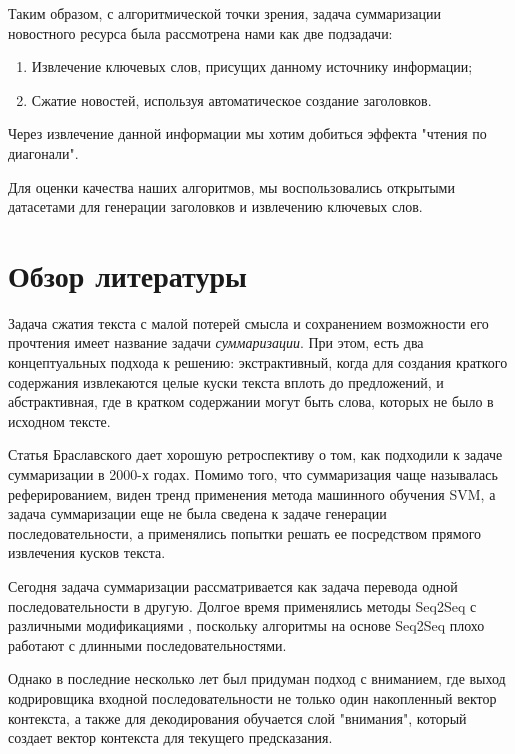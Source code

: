 \documentclass[14pt]{matmex-diploma-custom}
\begin{document}
Таким образом, с алгоритмической точки зрения, задача суммаризации новостного ресурса была рассмотрена нами как две подзадачи:
\begin{enumerate}
  \item Извлечение ключевых слов, присущих данному источнику информации;
  \item Сжатие новостей, используя автоматическое создание заголовков.
\end{enumerate}

Через извлечение данной информации мы хотим добиться эффекта "чтения по диагонали".

Для оценки качества наших алгоритмов, мы воспользовались открытыми датасетами для генерации заголовков и извлечению ключевых слов.

\section{Обзор литературы}
Задача сжатия текста с малой потерей смысла и сохранением возможности его прочтения
имеет название задачи \textit{суммаризации}. При этом, есть два концептуальных подхода к решению:
экстрактивный, когда для создания краткого содержания извлекаются целые куски текста вплоть до предложений,
и абстрактивная, где в кратком содержании могут быть слова, которых не было в исходном тексте.

Статья Браславского \cite{braslavski_gustelev} дает хорошую ретроспективу о том, как подходили к задаче суммаризации в 2000-х годах. Помимо того, что суммаризация чаще называлась реферированием, виден тренд применения метода машинного обучения SVM, а задача суммаризации еще не была сведена к задаче генерации последовательности, а применялись попытки решать ее посредством прямого извлечения кусков текста. 

Сегодня задача суммаризации рассматривается как задача перевода одной последовательности в другую. Долгое время применялись методы Seq2Seq с различными модификациями \cite{Putra2018IncorporatingTS}, поскольку алгоритмы на основе Seq2Seq плохо работают с длинными последовательностями.

Однако в последние несколько лет был придуман подход с вниманием, где выход кодрировщика входной последовательности не только один накопленный вектор контекста, а также для декодирования обучается слой "внимания", который создает вектор контекста для текущего предсказания.
\end{document}
